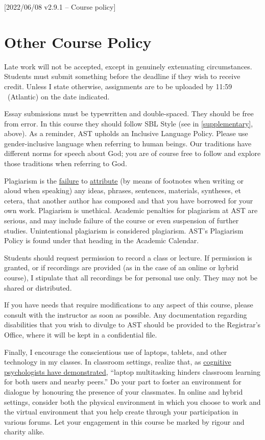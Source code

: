 [2022/06/08 v2.9.1 -- Course policy]

\section{Other Course Policy}
\label{policy}

Late work will not be accepted, except in genuinely extenuating
circumstances. Students must submit something before the deadline if
they wish to receive credit. Unless I state otherwise, assignments are
to be uploaded by 11:59 \PM\ (Atlantic) on the date indicated.

Essay submissions must be typewritten and double-spaced. They should be
free from error. In this course they should follow SBL Style (see
\cite{sbl2} in \autoref{supplementary}, above). As a reminder, AST
upholds an Inclusive Language Policy. Please use gender-inclusive
language when referring to human beings. Our traditions have different
norms for speech about God; you are of course free to follow and explore
those traditions when referring to God.


Plagiarism is the
\href{http://www.eerdmans.com/Pages/Item/59043/Commentary-Statement.aspx}{failure}
to \href{https://www.theguardian.com/world/2013/feb/09/german-education-minister-quits-phd-plagiarism}{attribute}
(by means of footnotes when writing or aloud when speaking) any ideas,
phrases, sentences, materials, syntheses, et cetera, that another author
has composed and that you have borrowed for your own work. Plagiarism is
unethical. Academic penalties for plagiarism at AST are serious, and may
include failure of the course or even suspension of further studies.
Unintentional plagiarism is considered plagiarism. AST's Plagiarism
Policy is found under that heading in the Academic
Calendar.

Students should request permission to record a class or lecture. If
permission is granted, or if recordings are provided (as in the case of
an online or hybrid course), I stipulate that all recordings be for
personal use only. They may not be shared or distributed.

If you have needs that require modifications to any aspect of this
course, please consult with the instructor as soon as possible. Any
documentation regarding disabilities that you wish to divulge to AST
should be provided to the Registrar’s Office, where it will be kept in a
confidential file.

Finally, I encourage the conscientious use of laptops, tablets, and
other technology in my classes. In classroom settings, realize that, as
\href{http://dx.doi.org/10.1016/j.compedu.2012.10.003}{cognitive
psychologists have demonstrated}, ``laptop multitasking hinders
classroom learning for both users and nearby peers.'' Do your part to
foster an environment for dialogue by honouring the presence of your
classmates. In online and hybrid settings, consider both the physical
environment in which you choose to work and the virtual environment that
you help create through your participation in various forums. Let your
engagement in this course be marked by rigour and charity alike.
